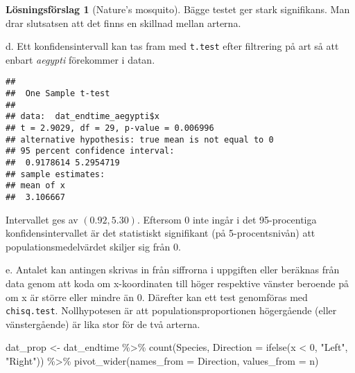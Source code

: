 \documentclass[
]{book}
\newenvironment{Shaded}{\begin{snugshade}}{\end{snugshade}}
\newcommand{\AttributeTok}[1]{\textcolor[rgb]{0.77,0.63,0.00}{#1}}
\newcommand{\DecValTok}[1]{\textcolor[rgb]{0.00,0.00,0.81}{#1}}
\newcommand{\FunctionTok}[1]{\textcolor[rgb]{0.00,0.00,0.00}{#1}}
\newcommand{\NormalTok}[1]{#1}
\newcommand{\OtherTok}[1]{\textcolor[rgb]{0.56,0.35,0.01}{#1}}
\newcommand{\SpecialCharTok}[1]{\textcolor[rgb]{0.00,0.00,0.00}{#1}}
\newcommand{\StringTok}[1]{\textcolor[rgb]{0.31,0.60,0.02}{#1}}
\theoremstyle{definition}
\theoremstyle{definition}
\theoremstyle{definition}
\theoremstyle{definition}
\newtheorem{hypothesis}{Lösningsförslag}[chapter]
\theoremstyle{remark}
\begin{document}
\begin{hypothesis}[Nature's mosquito]
Bägge testet ger stark signifikans. Man drar slutsatsen att det finns en skillnad mellan arterna.

d. Ett konfidensintervall kan tas fram med \texttt{t.test} efter filtrering på art så att enbart \emph{aegypti} förekommer i datan.

\begin{Shaded}
\end{Shaded}

\begin{verbatim}
## 
##  One Sample t-test
## 
## data:  dat_endtime_aegypti$x
## t = 2.9029, df = 29, p-value = 0.006996
## alternative hypothesis: true mean is not equal to 0
## 95 percent confidence interval:
##  0.9178614 5.2954719
## sample estimates:
## mean of x 
##  3.106667
\end{verbatim}

Intervallet ges av \((0.92, 5.30)\). Eftersom 0 inte ingår i det 95-procentiga konfidensintervallet är det statistiskt signifikant (på 5-procentsnivån) att populationsmedelvärdet skiljer sig från 0.

e. Antalet kan antingen skrivas in från siffrorna i uppgiften eller beräknas från data genom att koda om x-koordinaten till höger respektive vänster beroende på om x är större eller mindre än 0. Därefter kan ett test genomföras med \texttt{chisq.test}. Nollhypotesen är att populationsproportionen högergående (eller vänstergående) är lika stor för de två arterna.

\begin{Shaded}
\begin{Highlighting}[]
\NormalTok{dat\_prop }\OtherTok{\textless{}{-}}\NormalTok{ dat\_endtime }\SpecialCharTok{\%\textgreater{}\%} 
  \FunctionTok{count}\NormalTok{(Species, }\AttributeTok{Direction =} \FunctionTok{ifelse}\NormalTok{(x }\SpecialCharTok{\textless{}} \DecValTok{0}\NormalTok{, }\StringTok{"Left"}\NormalTok{, }\StringTok{"Right"}\NormalTok{)) }\SpecialCharTok{\%\textgreater{}\%} 
  \FunctionTok{pivot\_wider}\NormalTok{(}\AttributeTok{names\_from =}\NormalTok{ Direction, }\AttributeTok{values\_from =}\NormalTok{ n)}


\end{Highlighting}
\end{Shaded}
\end{hypothesis}
\end{document}
